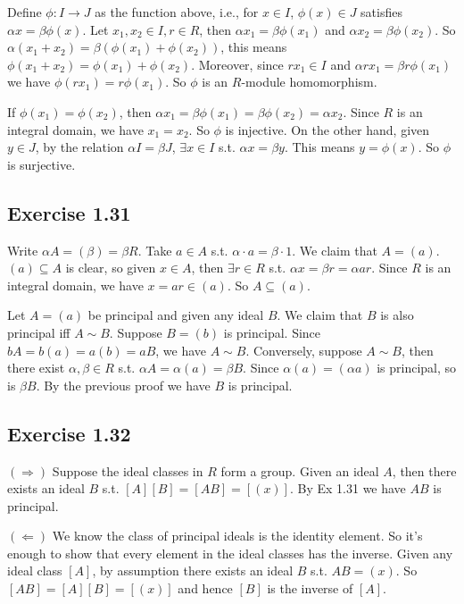 \documentclass[../Chapter.tex]{subfiles}
\begin{document}
Define $\phi:I\to J$ as the function above, i.e., for $x\in I$, $\phi(x)\in J$ satisfies $\alpha x=\beta\phi(x)$. Let $x_1,x_2\in I,r\in R$, then $\alpha x_1=\beta\phi(x_1)$ and $\alpha x_2=\beta\phi(x_2)$. So $\alpha(x_1+x_2)=\beta(\phi(x_1)+\phi(x_2))$, this means $\phi(x_1+x_2)=\phi(x_1)+\phi(x_2)$. Moreover, since $rx_1\in I$ and $\alpha rx_1=\beta r\phi(x_1)$ we have $\phi(rx_1)=r\phi(x_1)$. So $\phi$ is an $R$-module homomorphism.

If $\phi(x_1)=\phi(x_2)$, then $\alpha x_1=\beta\phi(x_1)=\beta\phi(x_2)=\alpha x_2$. Since $R$ is an integral domain, we have $x_1=x_2$. So $\phi$ is injective. On the other hand, given $y\in J$, by the relation $\alpha I=\beta J$, $\exists x\in I$ s.t. $\alpha x=\beta y$. This means $y=\phi(x)$. So $\phi$ is surjective.

\subsection*{Exercise 1.31}

Write $\alpha A=(\beta)=\beta R$. Take $a\in A$ s.t. $\alpha\cdot a=\beta\cdot 1$. We claim that $A=(a)$. $(a)\subseteq A$ is clear, so given $x\in A$, then $\exists r\in R$ s.t. $\alpha x=\beta r=\alpha ar$. Since $R$ is an integral domain, we have $x=ar\in (a)$. So $A\subseteq (a)$. 

Let $A=(a)$ be principal and given any ideal $B$. We claim that $B$ is also principal iff $A\sim B$. Suppose $B=(b)$ is principal. Since $bA=b(a)=a(b)=aB$, we have $A\sim B$. Conversely, suppose $A\sim B$, then there exist $\alpha,\beta\in R$ s.t. $\alpha A=\alpha(a)=\beta B$. Since $\alpha(a)=(\alpha a)$ is principal, so is $\beta B$. By the previous proof we have $B$ is principal.

\subsection*{Exercise 1.32}

$(\Rightarrow)$ Suppose the ideal classes in $R$ form a group. Given an ideal $A$, then there exists an ideal $B$ s.t. $[A][B]=[AB]=[(x)]$. By Ex 1.31 we have $AB$ is principal.

$(\Leftarrow)$ We know the class of principal ideals is the identity element. So it's enough to show that every element in the ideal classes has the inverse. Given any ideal class $[A]$, by assumption there exists an ideal $B$ s.t. $AB=(x)$. So $[AB]=[A][B]=[(x)]$ and hence $[B]$ is the inverse of $[A]$.
\end{document}
